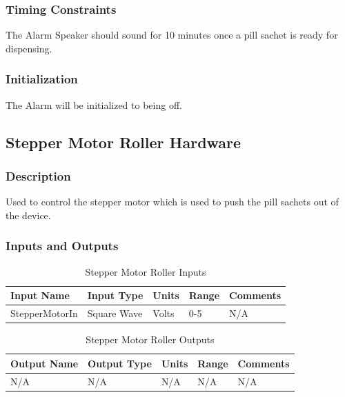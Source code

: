 \documentclass[12pt,titlepage]{article}
\begin{document}
\subsubsection*{Timing Constraints}
The Alarm Speaker should sound for 10 minutes once a pill sachet is ready for dispensing.  
\subsubsection*{Initialization}
The Alarm will be initialized to being off.
\subsection{Stepper Motor Roller Hardware }
\subsubsection*{Description}
Used to control the stepper motor which is used to push the pill sachets out of the device.
\subsubsection*{Inputs and Outputs}

\begin{table}[ht!]
\begin{center}
\begin{adjustbox}{max width=\textwidth}
\small
\begin{tabular}{|p{}|p{}|p{}|p{}|p{}|}
 \hline
 \textbf{Input Name} & \textbf{Input Type} & \textbf{Units} &\textbf{Range} & \textbf{Comments} \\
 \hline 
 StepperMotorIn & Square Wave & Volts & 0-5 & N/A \\
 \hline
\end{tabular}
\end{adjustbox}
\end{center}
\caption{Stepper Motor Roller Inputs}
\end{table}

\begin{table}[ht!]
\begin{center}
\begin{adjustbox}{max width=\textwidth}
\small
\begin{tabular}{|p{}|p{}|p{}|p{}|p{}|}
 \hline
 \textbf{Output Name} & \textbf{Output Type} & \textbf{Units} &\textbf{Range} & \textbf{Comments} \\
 \hline 
 N/A & N/A & N/A & N/A & N/A \\
 \hline
\end{tabular}
\end{adjustbox}
\end{center}
\caption{Stepper Motor Roller Outputs}
\end{table}
\end{document}
